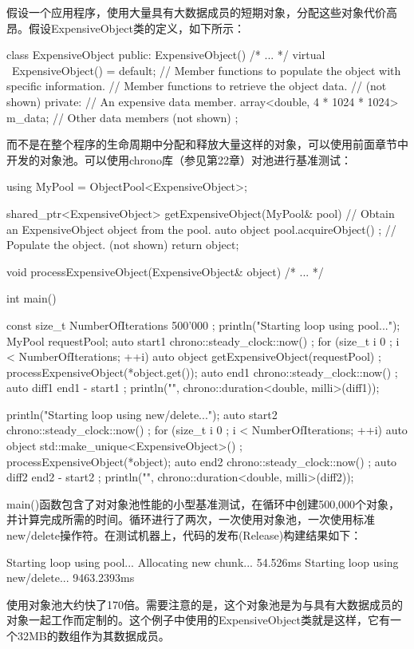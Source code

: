 
假设一个应用程序，使用大量具有大数据成员的短期对象，分配这些对象代价高昂。假设ExpensiveObject类的定义，如下所示：

\begin{cpp}
class ExpensiveObject
{
    public:
        ExpensiveObject() { /* ... */ }
        virtual ~ExpensiveObject() = default;
        // Member functions to populate the object with specific information.
        // Member functions to retrieve the object data.
        // (not shown)
    private:
        // An expensive data member.
        array<double, 4 * 1024 * 1024> m_data;
        // Other data members (not shown)
};
\end{cpp}

而不是在整个程序的生命周期中分配和释放大量这样的对象，可以使用前面章节中开发的对象池。可以使用chrono库（参见第22章）对池进行基准测试：

\begin{cpp}
using MyPool = ObjectPool<ExpensiveObject>;

shared_ptr<ExpensiveObject> getExpensiveObject(MyPool& pool)
{
    // Obtain an ExpensiveObject object from the pool.
    auto object { pool.acquireObject() };
    // Populate the object. (not shown)
    return object;
}

void processExpensiveObject(ExpensiveObject& object) { /* ... */ }

int main()
{
    const size_t NumberOfIterations { 500'000 };
    println("Starting loop using pool...");
    MyPool requestPool;
    auto start1 { chrono::steady_clock::now() };
    for (size_t i { 0 }; i < NumberOfIterations; ++i) {
        auto object { getExpensiveObject(requestPool) };
        processExpensiveObject(*object.get());
    }
    auto end1 { chrono::steady_clock::now() };
    auto diff1 { end1 - start1 };
    println("{}", chrono::duration<double, milli>(diff1));


    println("Starting loop using new/delete...");
    auto start2 { chrono::steady_clock::now() };
    for (size_t i { 0 }; i < NumberOfIterations; ++i) {
        auto object { std::make_unique<ExpensiveObject>() };
        processExpensiveObject(*object);
    }
    auto end2 { chrono::steady_clock::now() };
    auto diff2 { end2 - start2 };
    println("{}", chrono::duration<double, milli>(diff2));
}
\end{cpp}

main()函数包含了对对象池性能的小型基准测试，在循环中创建500,000个对象，并计算完成所需的时间。循环进行了两次，一次使用对象池，一次使用标准new/delete操作符。在测试机器上，代码的发布(Release)构建结果如下：

\begin{shell}
Starting loop using pool...
Allocating new chunk...
54.526ms
Starting loop using new/delete...
9463.2393ms
\end{shell}

使用对象池大约快了170倍。需要注意的是，这个对象池是为与具有大数据成员的对象一起工作而定制的。这个例子中使用的ExpensiveObject类就是这样，它有一个32MB的数组作为其数据成员。

